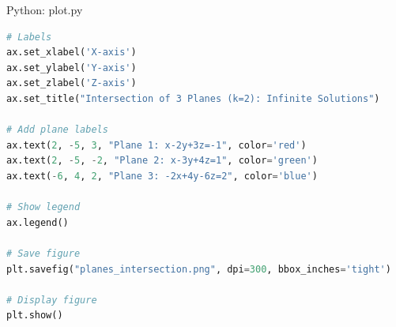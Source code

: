 \documentclass{beamer}
\numberwithin{equation}{section}
\theoremstyle{remark}
\begin{document}
\begin{frame}[fragile]{Python: plot.py}
\begin{lstlisting}[language=Python]
# Labels
ax.set_xlabel('X-axis')
ax.set_ylabel('Y-axis')
ax.set_zlabel('Z-axis')
ax.set_title("Intersection of 3 Planes (k=2): Infinite Solutions")

# Add plane labels
ax.text(2, -5, 3, "Plane 1: x-2y+3z=-1", color='red')
ax.text(2, -5, -2, "Plane 2: x-3y+4z=1", color='green')
ax.text(-6, 4, 2, "Plane 3: -2x+4y-6z=2", color='blue')

# Show legend
ax.legend()

# Save figure
plt.savefig("planes_intersection.png", dpi=300, bbox_inches='tight')

# Display figure
plt.show()

\end{lstlisting}
\end{frame}
\end{document}
